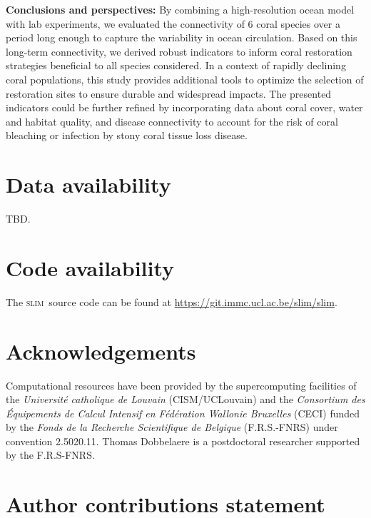 \documentclass[preprint,12pt,authoryear]{elsarticle}
\newcommand{\slim}{\textsc{slim}\ }
\begin{document}
	
	\textbf{Conclusions and perspectives:} By combining a high-resolution ocean model with lab experiments, we evaluated the connectivity of 6 coral species over a period long enough to capture the variability in ocean circulation. Based on this long-term connectivity, we derived robust indicators to inform coral restoration strategies beneficial to all species considered. In a context of rapidly declining coral populations, this study provides additional tools to optimize the selection of restoration sites to ensure durable and widespread impacts. The presented indicators could be further refined by incorporating data about coral cover, water and habitat quality, and disease connectivity to account for the risk of coral bleaching or infection by stony coral tissue loss disease.
	
	
	\section*{Data availability}
	
	TBD.
	
	\section*{Code availability}
	
	The \slim source code can be found at \href{https://git.immc.ucl.ac.be/slim/slim}{https://git.immc.ucl.ac.be/slim/slim}.
	
	\section*{Acknowledgements}
	
	Computational resources have been provided by the supercomputing facilities of the \textit{Universit\'e catholique de Louvain} (CISM/UCLouvain) and the \textit{Consortium des \'Equipements de Calcul Intensif en F\'ed\'eration Wallonie Bruxelles} (CECI) funded by the \textit{Fonds de la Recherche Scientifique de Belgique} (F.R.S.-FNRS) under convention 2.5020.11. Thomas Dobbelaere is a postdoctoral researcher supported by the F.R.S-FNRS.
	
	\section*{Author contributions statement}
	
\end{document}
